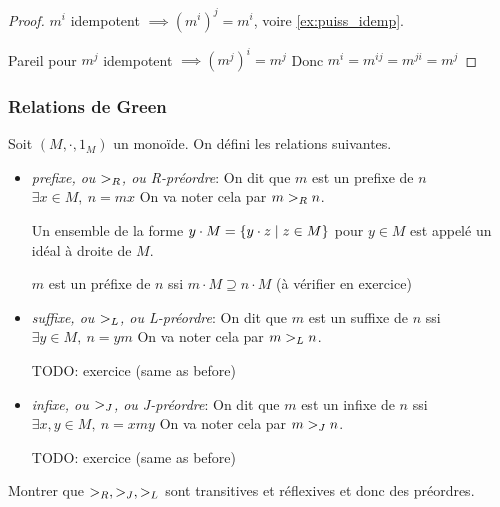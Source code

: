 \begin{proof}
	$m^i$ idempotent $\implies (m^i)^j = m^i$, voire \ref{ex:puiss_idemp}.

	Pareil pour $m^j$ idempotent $\implies (m^j)^i = m^j$
	Donc $m^i = m^{ij} = m^{ji} = m^{j}$
\end{proof}

\subsubsection{Relations de Green}

\begin{definition}
	Soit $(M,\cdot , 1_M)$ un monoïde. On défini les relations suivantes.

	\begin{itemize}
		\item \emph{prefixe, ou $>_R$, ou R-préordre}: On dit que $m$ est un prefixe de $n$ \ssi $\exists x \in M, \ n = mx$
		      On va noter cela par $m >_R n$.

		      Un ensemble de la forme $y \cdot M = \left\{y \cdot z \mid z \in M\right\}$ pour $y \in M$ est appelé un idéal à droite de $M$.

		      $m$ est un préfixe de $n$ ssi $m \cdot M \supseteq n \cdot M$ (à vérifier en exercice)


		\item \emph{suffixe, ou $>_L$, ou L-préordre}: On dit que $m$ est un suffixe de $n$ ssi $\exists y \in M, \ n = ym$
		      On va noter cela par $m >_L n$.

		      TODO: exercice (same as before)


		\item \emph{infixe, ou $>_J$, ou J-préordre}: On dit que $m$ est un infixe de $n$ ssi $\exists x,y \in M, \ n = xmy$
		      On va noter cela par $m >_J n$.

		      TODO: exercice (same as before)
	\end{itemize}
\end{definition}

\begin{exercice}
	Montrer que $>_R,>_J,>_L$  sont transitives et réflexives et donc des préordres.
\end{exercice}


